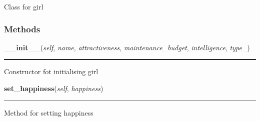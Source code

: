 Class for girl



  \subsubsection{Methods}

    \label{girl:girl:__init__}

    \vspace{0.5ex}

\hspace{.8\funcindent}\begin{boxedminipage}{\funcwidth}

    \raggedright \textbf{\_\_init\_\_}(\textit{self}, \textit{name}, \textit{attractiveness}, \textit{maintenance\_budget}, \textit{intelligence}, \textit{type\_})

    \vspace{-1.5ex}

    \rule{\textwidth}{0.5\fboxrule}
\setlength{\parskip}{2ex}
    Constructor fot initialising girl

\setlength{\parskip}{1ex}
    \end{boxedminipage}

    \label{girl:girl:set_happiness}

    \vspace{0.5ex}

\hspace{.8\funcindent}\begin{boxedminipage}{\funcwidth}

    \raggedright \textbf{set\_happiness}(\textit{self}, \textit{happiness})

    \vspace{-1.5ex}

    \rule{\textwidth}{0.5\fboxrule}
\setlength{\parskip}{2ex}
    Method for setting happiness

\setlength{\parskip}{1ex}
    \end{boxedminipage}

    \label{girl:girl:set_boyfriend}

